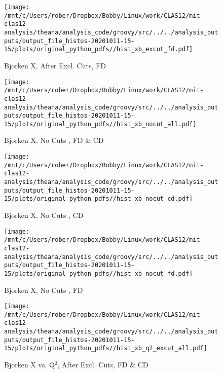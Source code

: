 \documentclass{article}
\begin{document}
\begin{landscape}
    \begin{figure}[h]
        \centering

        \texttt{[image: /mnt/c/Users/rober/Dropbox/Bobby/Linux/work/CLAS12/mit-clas12-analysis/theana/analysis\_code/groovy/src/../../analysis\_outputs/output\_file\_histos-20201011-15-15/plots/original\_python\_pdfs//hist\_xb\_excut\_fd.pdf]}
        \captionsetup{textformat=empty,labelformat=blank}
        \caption{Bjorken X, After Excl. Cuts, FD}
    \end{figure}
    \clearpage
    
    \begin{figure}[h]
        \centering

        \texttt{[image: /mnt/c/Users/rober/Dropbox/Bobby/Linux/work/CLAS12/mit-clas12-analysis/theana/analysis\_code/groovy/src/../../analysis\_outputs/output\_file\_histos-20201011-15-15/plots/original\_python\_pdfs//hist\_xb\_nocut\_all.pdf]}
        \captionsetup{textformat=empty,labelformat=blank}
        \caption{Bjorken X, No Cuts , FD \& CD}
    \end{figure}
    \clearpage
    
    \begin{figure}[h]
        \centering

        \texttt{[image: /mnt/c/Users/rober/Dropbox/Bobby/Linux/work/CLAS12/mit-clas12-analysis/theana/analysis\_code/groovy/src/../../analysis\_outputs/output\_file\_histos-20201011-15-15/plots/original\_python\_pdfs//hist\_xb\_nocut\_cd.pdf]}
        \captionsetup{textformat=empty,labelformat=blank}
        \caption{Bjorken X, No Cuts , CD}
    \end{figure}
    \clearpage
    
    \begin{figure}[h]
        \centering

        \texttt{[image: /mnt/c/Users/rober/Dropbox/Bobby/Linux/work/CLAS12/mit-clas12-analysis/theana/analysis\_code/groovy/src/../../analysis\_outputs/output\_file\_histos-20201011-15-15/plots/original\_python\_pdfs//hist\_xb\_nocut\_fd.pdf]}
        \captionsetup{textformat=empty,labelformat=blank}
        \caption{Bjorken X, No Cuts , FD}
    \end{figure}
    \clearpage
    
    \begin{figure}[h]
        \centering

        \texttt{[image: /mnt/c/Users/rober/Dropbox/Bobby/Linux/work/CLAS12/mit-clas12-analysis/theana/analysis\_code/groovy/src/../../analysis\_outputs/output\_file\_histos-20201011-15-15/plots/original\_python\_pdfs//hist\_xb\_q2\_excut\_all.pdf]}
        \captionsetup{textformat=empty,labelformat=blank}
        \caption{Bjorken X vs. Q$^{2}$, After Excl. Cuts, FD \& CD}
    \end{figure}
    \clearpage
    

\end{landscape}
\end{document}
